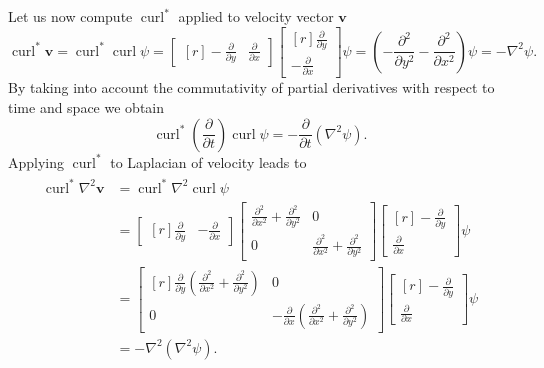 \documentclass{article}
\numberwithin{equation}{section}
\begin{document}
Let us now compute $\operatorname{curl}^*$ applied to velocity vector $\boldsymbol{v}$
\begin{equation}\label{eqn:curl-adj-curl}
	\operatorname{curl}^*\boldsymbol{v}=\operatorname{curl}^*\operatorname{curl}\psi=
	\begin{bmatrix*}[r]
	-\frac{\partial}{\partial y}&
	\frac{\partial}{\partial x}
	\end{bmatrix*}
	\begin{bmatrix*}[r]
	\frac{\partial}{\partial y} \\
	-\frac{\partial}{\partial x}
	\end{bmatrix*}
	\psi
	=\left(-\frac{\partial^2}{\partial y^2} -\frac{\partial^2 }{\partial x^2}\right) \psi =-\nabla^2 \psi.
\end{equation}
By taking into account the commutativity of partial derivatives with respect to time and space we obtain
\begin{equation}\label{eqn:transient-laplacian-psi}
	\operatorname{curl}^*\left(\frac{\partial}{\partial t}\right)\operatorname{curl}\psi=-\frac{\partial}{\partial t}\left(\nabla^2 \psi \right).
\end{equation}
Applying $\operatorname{curl}^*$ to Laplacian of velocity leads to
\begin{align}\begin{split}\label{eqn:biharmonic-psi}
	\operatorname{curl}^*\nabla^2\boldsymbol{v}
	&=\operatorname{curl}^*\nabla^2\operatorname{curl}\psi\\
	&=\begin{bmatrix*}[r]
	\frac{\partial}{\partial y}&
	-\frac{\partial}{\partial x}
	\end{bmatrix*}
	\begin{bmatrix}
	\frac{\partial^2}{\partial x^2}+\frac{\partial^2}{\partial y^2} & 0\\
	0	& \frac{\partial^2}{\partial x^2}+\frac{\partial^2}{\partial y^2}
	\end{bmatrix}
	\begin{bmatrix*}[r]
	-\frac{\partial}{\partial y} \\
	\frac{\partial}{\partial x}
	\end{bmatrix*}
	\psi\\
	&=\begin{bmatrix*}[r]
	\frac{\partial}{\partial y}\left(\frac{\partial^2}{\partial x^2}+\frac{\partial^2}{\partial y^2}\right) & 0\\
	0 & -\frac{\partial}{\partial x}\left(\frac{\partial^2}{\partial x^2}+\frac{\partial^2}{\partial y^2} \right)
	\end{bmatrix*}
	\begin{bmatrix*}[r]
	-\frac{\partial}{\partial y} \\
	\frac{\partial}{\partial x}
	\end{bmatrix*}
	\psi\\
	&=-\nabla^2\left(\nabla^2\psi\right).
\end{split}\end{align}
\end{document}
